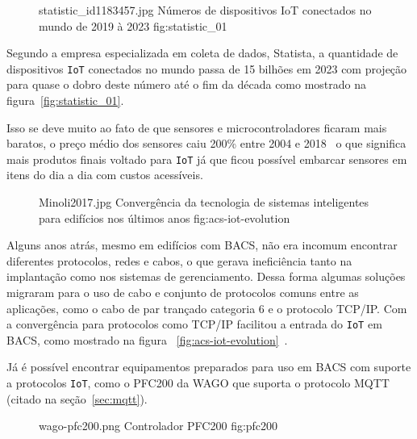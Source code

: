 \begin{figure}[H]
    {statistic_id1183457.jpg}                 %
    {Números de dispositivos IoT conectados no mundo de 2019 à 2023}     %
    {fig:statistic_01}                      %
\end{figure}

Segundo a empresa especializada em coleta de dados, Statista, 
a quantidade de dispositivos \verb'IoT' conectados no mundo passa de 15 bilhões em 
2023 com projeção para quase o dobro deste número até o fim da década 
\cite{statista-iot-connected-devices} como mostrado na figura~\ref{fig:statistic_01}. 

Isso se deve muito ao fato de que sensores e microcontroladores ficaram mais baratos, o 
preço médio dos sensores caiu 200\% entre 2004 e 2018~\cite{microsoft1} o que significa
mais produtos finais voltado para \verb'IoT' já que ficou possível embarcar sensores em itens 
do dia a dia com custos acessíveis.

\begin{figure}[H]
    {Minoli2017.jpg}                 %
    {Convergência da tecnologia de sistemas inteligentes para edifícios nos últimos anos}     %
    {fig:acs-iot-evolution}                      %
\end{figure}

Alguns anos atrás, mesmo em edifícios com BACS, não era incomum encontrar diferentes protocolos, 
redes e cabos, o que gerava ineficiência tanto na implantação como nos sistemas de gerenciamento. 
Dessa forma algumas soluções migraram para o uso de cabo e conjunto de protocolos comuns entre as 
aplicações, como o cabo de par trançado categoria 6 e o protocolo TCP/IP.
Com a convergência para protocolos como TCP/IP facilitou a entrada do \verb'IoT' em BACS, 
como mostrado na figura 
~\ref{fig:acs-iot-evolution}~\cite{Minoli2017}.

Já é possível encontrar equipamentos preparados para uso em BACS com suporte a protocolos \verb'IoT',
como o PFC200 da WAGO que suporta o protocolo MQTT (citado na seção~\ref{sec:mqtt}).

\begin{figure}[H]
    {wago-pfc200.png}                 %
    {Controlador PFC200}     %
    {fig:pfc200}                      %
\end{figure}